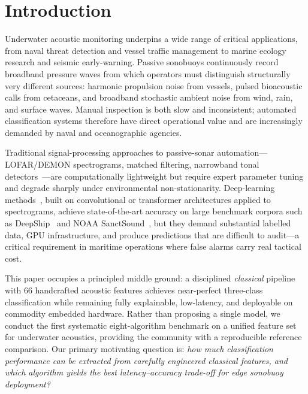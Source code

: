 \documentclass[conference]{IEEEtran}
\begin{document}
\section{Introduction}
\label{sec:intro}

Underwater acoustic monitoring underpins a wide range of critical applications, from naval threat detection and vessel traffic management to marine ecology research and seismic early-warning. Passive sonobuoys continuously record broadband pressure waves from which operators must distinguish structurally very different sources: harmonic propulsion noise from vessels, pulsed bioacoustic calls from cetaceans, and broadband stochastic ambient noise from wind, rain, and surface waves. Manual inspection is both slow and inconsistent; automated classification systems therefore have direct operational value and are increasingly demanded by naval and oceanographic agencies.

Traditional signal-processing approaches to passive-sonar automation---LOFAR/DEMON spectrograms, matched filtering, narrowband tonal detectors~\cite{lofar_demon}---are computationally lightweight but require expert parameter tuning and degrade sharply under environmental non-stationarity. Deep-learning methods~\cite{dl_underwater, deepship, transformer_acoustic}, built on convolutional or transformer architectures applied to spectrograms, achieve state-of-the-art accuracy on large benchmark corpora such as DeepShip~\cite{deepship} and NOAA SanctSound~\cite{noaa}, but they demand substantial labelled data, GPU infrastructure, and produce predictions that are difficult to audit---a critical requirement in maritime operations where false alarms carry real tactical cost.

This paper occupies a principled middle ground: a disciplined \textit{classical} pipeline with 66 handcrafted acoustic features achieves near-perfect three-class classification while remaining fully explainable, low-latency, and deployable on commodity embedded hardware. Rather than proposing a single model, we conduct the first systematic eight-algorithm benchmark on a unified feature set for underwater acoustics, providing the community with a reproducible reference comparison. Our primary motivating question is: \textit{how much classification performance can be extracted from carefully engineered classical features, and which algorithm yields the best latency--accuracy trade-off for edge sonobuoy deployment?}
\end{document}
